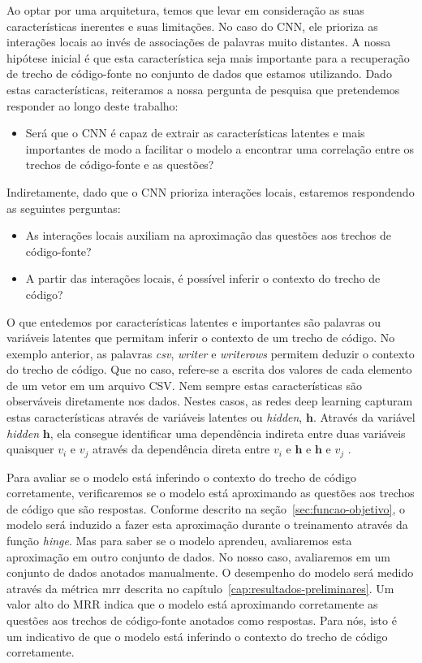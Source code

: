Ao optar por uma arquitetura, temos que levar em consideração as suas características inerentes e suas limitações. No caso do CNN, ele prioriza as interações locais ao invés de associações de palavras muito distantes. A nossa hipótese inicial é que esta característica seja mais importante para a recuperação de trecho de código-fonte no conjunto de dados que estamos utilizando. Dado estas características, reiteramos a nossa pergunta de pesquisa que pretendemos responder ao longo deste trabalho:

\begin{itemize}
    \item Será que o CNN é capaz de extrair as características latentes e mais importantes de modo a facilitar o modelo a encontrar uma correlação entre os trechos de código-fonte e as questões?
\end{itemize}

Indiretamente, dado que o CNN prioriza interações locais, estaremos respondendo as seguintes perguntas:
\begin{itemize}
    
        \item As interações locais auxiliam na aproximação das questões aos trechos de código-fonte?
        \item A partir das interações locais, é possível inferir o contexto do trecho de código?
\end{itemize}



O que entedemos por características latentes e importantes são palavras ou variáveis latentes que permitam inferir o contexto de um trecho de código. No exemplo anterior, as palavras \emph{csv}, \emph{writer} e \emph{writerows} permitem deduzir o contexto do trecho de código. Que no caso, refere-se a escrita dos valores de cada elemento de um vetor em um arquivo CSV. Nem sempre estas características são observáveis diretamente nos dados. Nestes casos, as redes deep learning capturam estas características através de variáveis latentes ou \textit{hidden}, $\bm{h}$. Através da variável \textit{hidden} $\bm{h}$, ela consegue identificar uma dependência indireta entre duas variáveis quaisquer $v_{i}$ e $v_{j}$ através da dependência direta entre $v_{i}$ e $\bm{h}$ e $\bm{h}$ e $v_{j}$ \citep{Goodfellow-et-al-2016:structured-probabilistic-models-for-deep-learning}.

Para avaliar se o modelo está inferindo o contexto do trecho de código corretamente, verificaremos se o modelo está aproximando as questões aos trechos de código que são respostas. Conforme descrito na seção~\ref{sec:funcao-objetivo}, o modelo será induzido a fazer esta aproximação durante o treinamento através da função \textit{hinge}. Mas para saber se o modelo aprendeu, avaliaremos esta aproximação em outro conjunto de dados. No nosso caso, avaliaremos em um conjunto de dados anotados manualmente. O desempenho do modelo será medido através da métrica \acrshort{mrr} descrita no capítulo~\ref{cap:resultados-preliminares}. Um valor alto do MRR indica que o modelo está aproximando corretamente as questões aos trechos de código-fonte anotados como respostas. Para nós, isto é um indicativo de que o modelo está inferindo o contexto do trecho de código corretamente.
